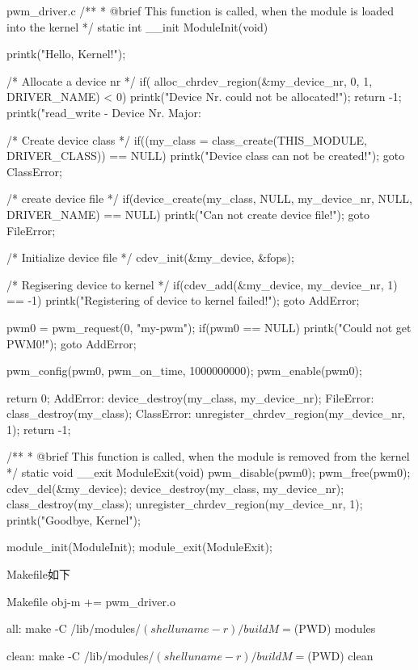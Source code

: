 \documentclass[lang=cn,newtx,10pt,scheme=chinese]{elegantbook}
\begin{document}
\begin{mycode}{pwm\_driver.c}
/**
 * @brief This function is called, when the module is loaded into the kernel
 */
static int __init ModuleInit(void) {
    printk("Hello, Kernel!\n");

    /* Allocate a device nr */
    if( alloc_chrdev_region(&my_device_nr, 0, 1, DRIVER_NAME) < 0) {
        printk("Device Nr. could not be allocated!\n");
        return -1;
    }
    printk("read_write - Device Nr. Major: %

    /* Create device class */
    if((my_class = class_create(THIS_MODULE, DRIVER_CLASS)) == NULL) {
        printk("Device class can not be created!\n");
        goto ClassError;
    }

    /* create device file */
    if(device_create(my_class, NULL, my_device_nr, NULL, DRIVER_NAME) == NULL) {
        printk("Can not create device file!\n");
        goto FileError;
    }

    /* Initialize device file */
    cdev_init(&my_device, &fops);

    /* Regisering device to kernel */
    if(cdev_add(&my_device, my_device_nr, 1) == -1) {
        printk("Registering of device to kernel failed!\n");
        goto AddError;
    }

    pwm0 = pwm_request(0, "my-pwm");
    if(pwm0 == NULL) {
        printk("Could not get PWM0!\n");
        goto AddError;
    }

    pwm_config(pwm0, pwm_on_time, 1000000000);
    pwm_enable(pwm0);

    return 0;
AddError:
    device_destroy(my_class, my_device_nr);
FileError:
    class_destroy(my_class);
ClassError:
    unregister_chrdev_region(my_device_nr, 1);
    return -1;
}

/**
 * @brief This function is called, when the module is removed from the kernel
 */
static void __exit ModuleExit(void) {
    pwm_disable(pwm0);
    pwm_free(pwm0);
    cdev_del(&my_device);
    device_destroy(my_class, my_device_nr);
    class_destroy(my_class);
    unregister_chrdev_region(my_device_nr, 1);
    printk("Goodbye, Kernel\n");
}

module_init(ModuleInit);
module_exit(ModuleExit);
\end{mycode}

Makefile如下

\begin{mycode}{Makefile}
obj-m += pwm_driver.o

all:
    make -C /lib/modules/$(shell uname -r)/build M=$(PWD) modules

clean:
    make -C /lib/modules/$(shell uname -r)/build M=$(PWD) clean
\end{mycode}
\end{document}
